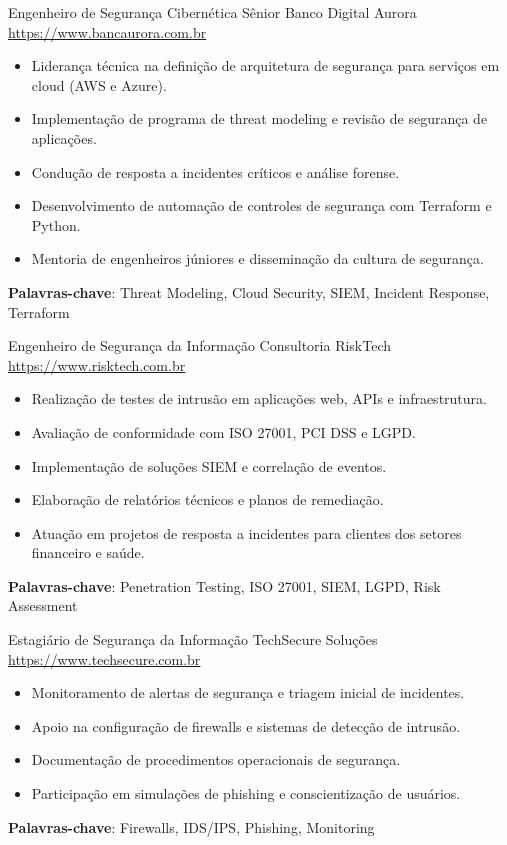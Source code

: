 \documentclass[a4paper, serif, 10pt]{moderncv}
\begin{document}
        {Engenheiro de Segurança Cibernética Sênior}
        {Banco Digital Aurora}
        {\url{https://www.bancaurora.com.br}}
        {}
        {\begin{itemize}
\item Liderança técnica na definição de arquitetura de segurança para serviços em cloud (AWS e Azure).
\item Implementação de programa de threat modeling e revisão de segurança de aplicações.
\item Condução de resposta a incidentes críticos e análise forense.
\item Desenvolvimento de automação de controles de segurança com Terraform e Python.
\item Mentoria de engenheiros júniores e disseminação da cultura de segurança.
\end{itemize}
\textbf{Palavras-chave}: Threat Modeling, Cloud Security, SIEM, Incident Response, Terraform}

        {Engenheiro de Segurança da Informação}
        {Consultoria RiskTech}
        {\url{https://www.risktech.com.br}}
        {}
        {\begin{itemize}
\item Realização de testes de intrusão em aplicações web, APIs e infraestrutura.
\item Avaliação de conformidade com ISO 27001, PCI DSS e LGPD.
\item Implementação de soluções SIEM e correlação de eventos.
\item Elaboração de relatórios técnicos e planos de remediação.
\item Atuação em projetos de resposta a incidentes para clientes dos setores financeiro e saúde.
\end{itemize}
\textbf{Palavras-chave}: Penetration Testing, ISO 27001, SIEM, LGPD, Risk Assessment}

        {Estagiário de Segurança da Informação}
        {TechSecure Soluções}
        {\url{https://www.techsecure.com.br}}
        {}
        {\begin{itemize}
\item Monitoramento de alertas de segurança e triagem inicial de incidentes.
\item Apoio na configuração de firewalls e sistemas de detecção de intrusão.
\item Documentação de procedimentos operacionais de segurança.
\item Participação em simulações de phishing e conscientização de usuários.
\end{itemize}
\textbf{Palavras-chave}: Firewalls, IDS/IPS, Phishing, Monitoring}
\end{document}

